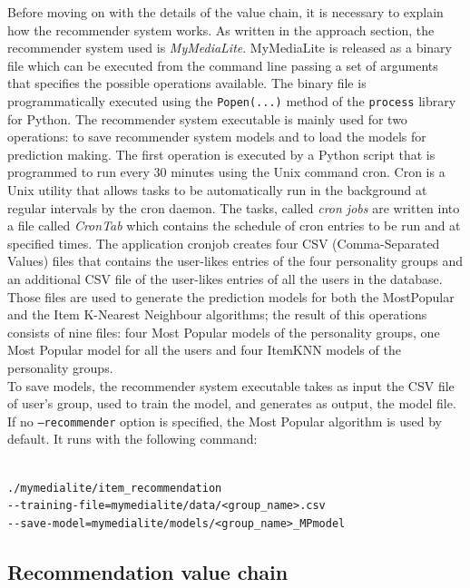 \documentclass[b5paper,10pt,twoside,cucitura]{toptesi}
\begin{document}
Before moving on with the details of the value chain, it is necessary to explain how the recommender system works. As written in the approach section, the recommender system used is \textit{MyMediaLite}. MyMediaLite is released as a binary file which can be executed from the command line passing a set of arguments that specifies the possible operations available. The binary file is programmatically executed using the \texttt{Popen(...)} method of the \texttt{process} library for Python. The recommender system executable is mainly used for two operations: to save recommender system models and to load the models for prediction making. The first operation is executed by a Python script that is programmed to run every 30 minutes using the Unix command cron. Cron is a Unix utility that allows tasks to be automatically run in the background at regular intervals by the cron daemon. The tasks, called \textit{cron jobs} are written into a file called \textit{CronTab} which contains the schedule of cron entries to be run and at specified times. The application cronjob creates four CSV (Comma-Separated Values) files that contains the user-likes entries of the four personality groups and an additional CSV file of the user-likes entries of all the users in the database. Those files are used to generate the prediction models for both the MostPopular and the Item K-Nearest Neighbour algorithms; the result of this operations consists of nine files: four Most Popular models of the personality groups, one Most Popular model for all the users and four ItemKNN models of the personality groups.
\\
To save models, the recommender system executable takes as input the CSV file of user's group, used to train the model, and generates as output, the model file. If no \texttt{--recommender} option is specified, the Most Popular algorithm is used by default. It runs with the following command:

\begin{verbatim}

./mymedialite/item_recommendation 
--training-file=mymedialite/data/<group_name>.csv 
--save-model=mymedialite/models/<group_name>_MPmodel

\end{verbatim}


\subsection{Recommendation value chain}
\end{document}
